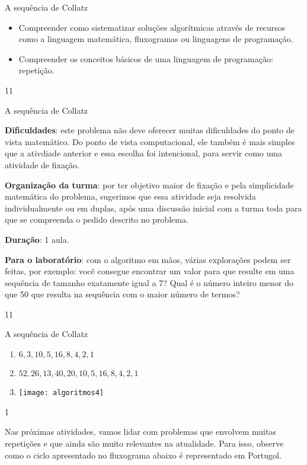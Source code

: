 \begin{objectives}{A sequência de Collatz}
{
\begin{itemize}
\item Compreender como sistematizar soluções algorítmicas através de recursos como a linguagem matemática, fluxogramas ou linguagens de programação.

\item Compreender os conceitos básicos de uma linguagem de programação: repetição.
\end{itemize}
}{1}{1}
\end{objectives}
\marginpar{\vspace{-2.5em}}
\begin{sugestions}{A sequência de Collatz}
{
\textbf{Dificuldades}: este problema não deve oferecer muitas dificuldades do ponto de vista matemático. Do ponto de vista computacional, ele também é mais simples que a ativdiade anterior e essa escolha foi intencional, para servir como uma atividade de fixação.

\textbf{Organização da turma}: por ter objetivo maior de fixação e pela simplicidade matemática do problema, sugerimos que essa atividade seja resolvida individualmente ou em duplas, após uma discussão inicial com a turma toda para que se compreenda o pedido descrito no problema.

\textbf{Duração}: 1 aula.

\textbf{Para o laboratório}: com o algoritmo em mãos, várias explorações podem ser feitas, por exemplo: você consegue encontrar um valor para  que resulte em uma sequência de tamanho exatamente igual a 7? Qual é o número inteiro menor do que 50 que resulta na sequência com o maior número de termos?
}{1}{1}
\end{sugestions}
\marginpar{\vspace{-1em}}
\begin{answer}{A sequência de Collatz}
{
\begin{enumerate}
\item $6, 3, 10, 5, 16, 8, 4, 2, 1$
\item $52, 26, 13, 40, 20, 10, 5, 16, 8, 4, 2, 1$
\item {}
{
\texttt{[image: algoritmos4]}
}
\end{enumerate}
}{1}
\end{answer}


Nas próximas atividades, vamos lidar com problemas que envolvem muitas repetições e que ainda são muito relevantes na atualidade. Para isso, observe como o ciclo apresentado no fluxograma abaixo é representado em Portugol.

